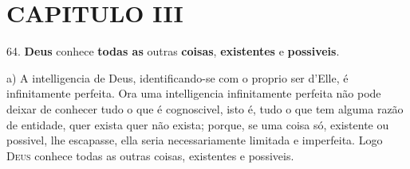 
\chapter*{CAPITULO III}

 64. \textbf{Deus} conhece \textbf{todas as} outras \textbf{coisas}, \textbf{existentes} e \textbf{possiveis}.

a) A intelligencia de Deus, identificando-se com o proprio ser d'Elle, é infinitamente perfeita. Ora uma intelligencia infinitamente perfeita não pode deixar de conhecer tudo o que é cognoscivel, isto é, tudo o que tem alguma razão de entidade, quer exista quer não exista; porque, se uma coisa só, existente ou possivel, lhe escapasse, ella seria necessariamente limitada e imperfeita. Logo \textsc{Deus} conhece todas as outras coisas, existentes e possiveis.

